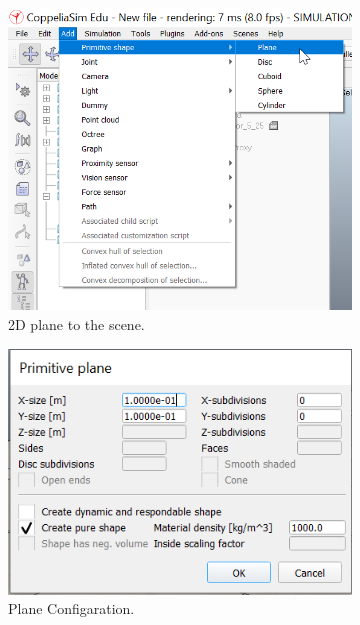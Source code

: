 \begin{figure}[h!]
  \centering
  \begin{subfigure}[b]{0.4\linewidth}
    \includegraphics[width=\linewidth]{figures/adding_2d_plane.png}
    \caption{2D plane to the scene.}
  \end{subfigure}
  \begin{subfigure}[b]{0.4\linewidth}
    \includegraphics[width=\linewidth]{figures/config_plane.png}
    \caption{Plane Configaration.}
  \end{subfigure}
 \begin{subfigure}[b]{0.6\linewidth}

\end{subfigure}
\end{figure}
